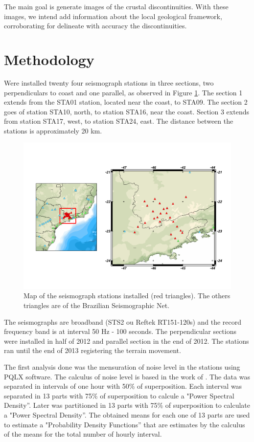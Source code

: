 \documentclass[twoside,letterpaper,twocolumn]{article}
\begin{document}
The main goal is generate images of the crustal discontinuities. With these images, we intend add information about the local geological framework, corroborating for delineate with accuracy the discontinuities.


\section{Methodology}

Were installed twenty four seismograph stations in three sections, two perpendiculars to coast and one parallel, as observed in Figure \ref{figura1}. The section 1 extends from the STA01 station, located near the coast, to STA09. The section 2 goes of station STA10, north, to station STA16, near the coast. Section 3 extends from station STA17, west, to station STA24, east. The distance between the stations  is approximately 20 km.


\begin{figure}[!ht]
\centering
\includegraphics[scale=0.5]{mapa_das_estacoes_simosgraficas_instaladas.png}
\caption{Map of the seismograph stations installed (red triangles). The others triangles are of the Brazilian Seismographic Net.}
\label{figura1}
\end{figure}


The seismographs are broadband (STS2 ou Reftek RT151-120s) and the record frequency band is at interval 50 Hz - 100 seconds. The perpendicular sections were installed in half of 2012 and parallel section in the end of 2012. The stations ran until the end of 2013 registering the terrain movement.

The first analysis done was the mensuration of noise level in the stations using PQLX software. The calculus of noise level is based in the work of \cite{mcnamara_ambient_2004}. The data was separated in intervals of one hour with 50\% of superposition. Each interval was separated in 13 parts with 75\% of superposition to calcule a "Power Spectral Density”. Later was partitioned in 13 parts with 75\% of superposition to calculate a "Power Spectral Density”. The obtained means for each one of 13 parts are used to estimate a "Probability Density Functions” that are estimates by the calculus of the means for the total number of hourly interval.
\end{document}
